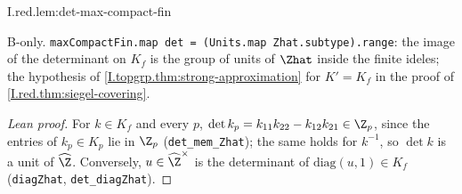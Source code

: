\begin{lemma}[$\det K_f=\Zhat^\times$]
\bonly
{}
\end{lemma}
\begin{tfformal}{I.red.lem:det-max-compact-fin}
\begin{tffidelity}
B-only. \texttt{maxCompactFin.map det = (Units.map Zhat.subtype).range}: the image of the determinant on $K_f$ is the group of units of $\Zhat$ inside the finite ideles; the hypothesis of \cref{I.topgrp.thm:strong-approximation} for $K'=K_f$ in the proof of \cref{I.red.thm:siegel-covering}.
\end{tffidelity}
\end{tfformal}
\begin{proof}[Lean proof]
For $k\in K_f$ and every $p$, $\det k_p=k_{11}k_{22}-k_{12}k_{21}\in\Z_p$, since the entries of $k_p\in K_p$ lie in $\Z_p$ (\texttt{det\_mem\_Zhat}); the same holds for $k^{-1}$, so $\det k$ is a unit of $\widehat\Z$. Conversely, $u\in\widehat\Z^\times$ is the determinant of $\mathrm{diag}(u,1)\in K_f$ (\texttt{diagZhat}, \texttt{det\_diagZhat}).
\end{proof}

